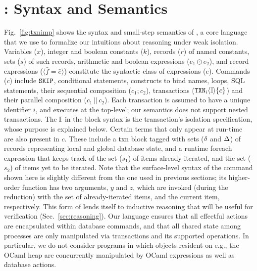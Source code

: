 \section{\txnimp: Syntax and Semantics}
\label{sec:opsem}

\label{sec:syntax}



Fig.~\ref{fig:txnimp} shows the syntax and small-step semantics of
\txnimp, a core language that we use to formalize our intuitions about
reasoning under weak isolation. Variables ($x$), integer and boolean
constants ($k$), records ($r$) of named constants, sets ($s$) of such
records, arithmetic and boolean expressions ($e_1 \odot e_2$), and
record expressions ($\langle \bar{f}=\bar{e} \rangle$) constitute the
syntactic class of expressions ($e$). Commands ($c$) include ${\tt SKIP}$,
conditional statements,  constructs to bind names, 
loops, SQL statements, their sequential composition ($c_1;c_2$),
transactions (${\tt TXN}_{i}\langle \mathbb{I} \rangle\{c\}$) and their parallel composition
($c_1\,||\,c_2$). Each transaction is assumed to have a unique
identifier $i$, and executes at the top-level; our semantics does not
support nested transactions. The $\mathbb{I}$ in the  block syntax is
the transaction's isolation specification, whose purpose is explained
below.  Certain terms that only appear at run-time are also present in
$c$.  These include a {\sf txn} block tagged with sets ($\delta$ and
$\Delta$) of records representing local and global database state, and a
runtime {\sf foreach} expression that keeps track of the set ($s_1$)
of items already iterated, and the set ($s_2$) of items yet to be
iterated. Note that the surface-level syntax of the 
command shown here is slightly different from the one used in previous
sections; its higher-order function has two arguments, $y$ and $z$,
which are invoked (during the reduction) with the set of
already-iterated items, and the current item, respectively. This form
of  lends itself to inductive reasoning that will be useful
for verification (Sec.~\ref{sec:reasoning}). Our language ensures
that all effectful actions are encapsulated within database commands,
and that all shared state among processes are only manipulated via
transactions and its supported operations.  In particular, we do not
consider programs in which objects resident on e.g., the OCaml heap
are concurrently manipulated by OCaml expressions as well as database
actions.



